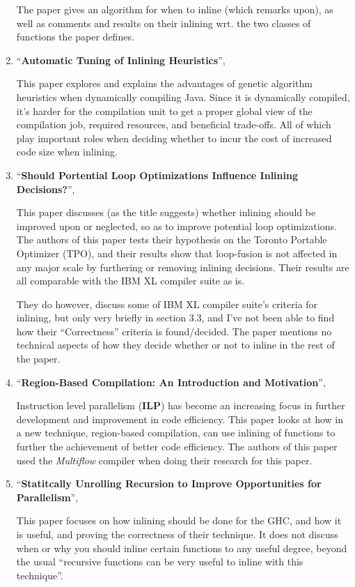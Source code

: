 \begin{enumerate}
The paper gives an algorithm for when to inline (which \cite{GHCPaper} remarks
upon), as well as comments and results on their inlining wrt. the two classes of
functions the paper defines.

	\item ``\textbf{Automatic Tuning of Inlining Heuristics}'',
\cite{AutoTuningJavaHeuristics}

This paper explores and explains the advantages of genetic algorithm  heuristics
when dynamically compiling Java. Since it is dynamically compiled, it's harder
for the compilation unit to get a proper global view of the compilation job,
required resources, and beneficial trade-offs. All of which play important roles
when deciding whether to incur the cost of increased code size when inlining.

	\item ``\textbf{Should Portential Loop Optimizations Influence Inlining Decisions?}'',

This paper discusses (as the title suggests) whether inlining should be improved
upon or neglected, so as to improve potential loop optimizations. The authors of
this paper tests their hypothesis on the Toronto Portable Optimizer (TPO), and
their results show that loop-fusion is not affected in any major scale by
furthering or removing inlining decisions. Their results are all comparable with
the IBM XL compiler suite as is.

They do however, discuss some of IBM XL compiler suite's criteria for inlining,
but only very briefly in section 3.3, and I've not been able to find how their
``Correctness'' criteria is found/decided. The paper mentions no technical aspects of how they decide whether or not to inline in the rest of the paper.

	\item ``\textbf{Region-Based Compilation: An Introduction and Motivation}'',

Instruction level parallelism (\textbf{ILP}) has become an increasing focus in
further development and improvement in code efficiency. This paper looks at how
in a new technique, region-based compilation, can use inlining of functions to
further the achievement of better code efficiency. The authors of this paper
used the \textit{Multiflow} compiler when doing their research for this paper.

	\item ``\textbf{Statitcally Unrolling Recursion to Improve Opportunities for Parallelism}'',

This paper focuses on how inlining should be done for the GHC, and how it is
useful, and proving the correctness of their technique. It does not discuss when
or why you should inline certain functions to any useful degree, beyond the
usual ``recursive functions can be very useful to inline with this technique''.

\end{enumerate}
